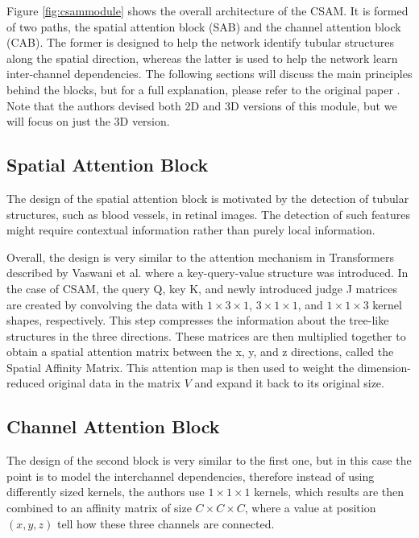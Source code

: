 \documentclass[
  digital,     %
  oneside,     %
  nosansbold,  %
  nocolorbold, %
  lof,         %
  lot,         %
]{fithesis4}
\begin{document}
Figure \ref{fig:csammodule} shows the overall architecture of the CSAM. It is formed of two paths, the spatial attention block (SAB) and the channel attention block (CAB). The former is designed to help the network identify tubular structures along the spatial direction, whereas the latter is used to help the network learn inter-channel dependencies. The following sections will discuss the main principles behind the blocks, but for a full explanation, please refer to the original paper \parencite{Mou2021}. Note that the authors devised both 2D and 3D versions of this module, but we will focus on just the 3D version.

\subsection*{Spatial Attention Block}
The design of the spatial attention block is motivated by the detection of tubular structures, such as blood vessels, in retinal images. The detection of such features might require contextual information rather than purely local information.

Overall, the design is very similar to the attention mechanism in Transformers described by Vaswani et al. \parencite{Vaswani2017attention} where a key-query-value structure was introduced. In the case of CSAM, the query Q, key K, and newly introduced judge J matrices are created by convolving the data with $1 \times 3 \times 1$, $3 \times 1 \times 1$, and $1 \times 1 \times 3$ kernel shapes, respectively. This step compresses the information about the tree-like structures in the three directions. These matrices are then multiplied together to obtain a spatial attention matrix between the x, y, and z directions, called the Spatial Affinity Matrix. This attention map is then used to weight the dimension-reduced original data in the matrix $V$ and expand it back to its original size.

\subsection*{Channel Attention Block}
The design of the second block is very similar to the first one, but in this case the point is to model the interchannel dependencies, therefore instead of using differently sized kernels, the authors use $1 \times 1 \times 1$ kernels, which results are then combined to an affinity matrix of size $C \times C \times C$, where a value at position $(x,y,z)$ tell how these three channels are connected.
\end{document}
